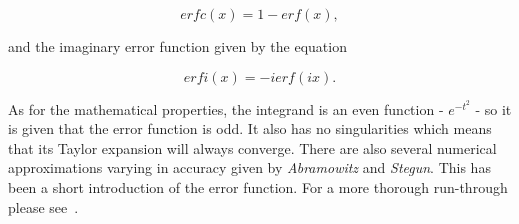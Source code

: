 \documentclass[12pt, twocolumn]{article}
\begin{document}
\begin{equation*}
    erfc(x) = 1  - erf(x),
\end{equation*}

\noindent and the imaginary error function given by the equation

\begin{equation*}
    erfi(x) = - i erf(ix).
\end{equation*}

\noindent As for the mathematical properties, the integrand is an even function - $e^{-t^2}$ - so it is given that the error function is odd. It also has no singularities which means that its Taylor expansion will always converge.
There are also several numerical approximations varying in accuracy given by \textit{Abramowitz} and \textit{Stegun}.
This has been a short introduction of the error function. For a more thorough run-through please see~\cite{mymain}.

\printbibliography
\end{document}
